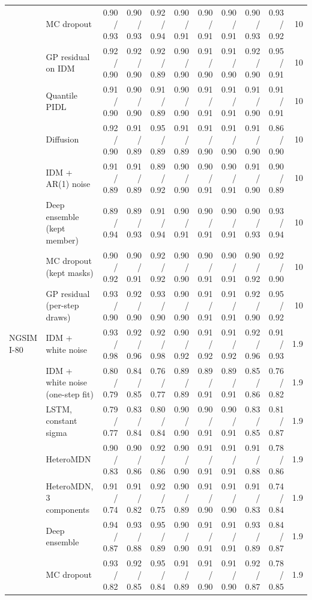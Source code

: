 \begin{longtable}{llrrrrrrrrr}
 & MC dropout & 0.90 / 0.93 & 0.90 / 0.93 & 0.92 / 0.94 & 0.90 / 0.91 & 0.90 / 0.91 & 0.90 / 0.91 & 0.90 / 0.93 & 0.93 / 0.92 & 10 \\
 & GP residual on IDM & 0.92 / 0.90 & 0.92 / 0.90 & 0.92 / 0.89 & 0.90 / 0.90 & 0.91 / 0.90 & 0.91 / 0.90 & 0.92 / 0.90 & 0.95 / 0.91 & 10 \\
 & Quantile PIDL & 0.91 / 0.90 & 0.90 / 0.90 & 0.91 / 0.89 & 0.90 / 0.90 & 0.91 / 0.91 & 0.91 / 0.91 & 0.91 / 0.90 & 0.91 / 0.91 & 10 \\
 & Diffusion & 0.92 / 0.90 & 0.91 / 0.89 & 0.95 / 0.89 & 0.91 / 0.89 & 0.91 / 0.90 & 0.91 / 0.90 & 0.91 / 0.90 & 0.86 / 0.90 & 10 \\
 & IDM + AR(1) noise & 0.91 / 0.89 & 0.91 / 0.89 & 0.89 / 0.92 & 0.90 / 0.90 & 0.90 / 0.91 & 0.90 / 0.91 & 0.91 / 0.90 & 0.90 / 0.89 & 10 \\
 & Deep ensemble (kept member) & 0.89 / 0.94 & 0.89 / 0.93 & 0.91 / 0.94 & 0.90 / 0.91 & 0.90 / 0.91 & 0.90 / 0.91 & 0.90 / 0.93 & 0.93 / 0.94 & 10 \\
 & MC dropout (kept masks) & 0.90 / 0.92 & 0.90 / 0.91 & 0.92 / 0.92 & 0.90 / 0.90 & 0.90 / 0.91 & 0.90 / 0.91 & 0.90 / 0.92 & 0.92 / 0.90 & 10 \\
 & GP residual (per-step draws) & 0.93 / 0.90 & 0.92 / 0.90 & 0.93 / 0.90 & 0.90 / 0.90 & 0.91 / 0.91 & 0.91 / 0.91 & 0.92 / 0.90 & 0.95 / 0.92 & 10 \\
\midrule
NGSIM I-80 & IDM + white noise & 0.93 / 0.98 & 0.92 / 0.96 & 0.92 / 0.98 & 0.90 / 0.92 & 0.91 / 0.92 & 0.91 / 0.92 & 0.92 / 0.96 & 0.91 / 0.93 & 1.9 \\
 & IDM + white noise (one-step fit) & 0.80 / 0.79 & 0.84 / 0.85 & 0.76 / 0.77 & 0.89 / 0.89 & 0.89 / 0.91 & 0.89 / 0.91 & 0.85 / 0.86 & 0.76 / 0.82 & 1.9 \\
 & LSTM, constant sigma & 0.79 / 0.77 & 0.83 / 0.84 & 0.80 / 0.84 & 0.90 / 0.90 & 0.90 / 0.91 & 0.90 / 0.91 & 0.83 / 0.85 & 0.81 / 0.87 & 1.9 \\
 & HeteroMDN & 0.90 / 0.83 & 0.90 / 0.86 & 0.92 / 0.86 & 0.90 / 0.90 & 0.91 / 0.91 & 0.91 / 0.91 & 0.91 / 0.88 & 0.78 / 0.86 & 1.9 \\
 & HeteroMDN, 3 components & 0.91 / 0.74 & 0.91 / 0.82 & 0.92 / 0.75 & 0.90 / 0.89 & 0.91 / 0.90 & 0.91 / 0.90 & 0.91 / 0.83 & 0.74 / 0.84 & 1.9 \\
 & Deep ensemble & 0.94 / 0.87 & 0.93 / 0.88 & 0.95 / 0.89 & 0.90 / 0.90 & 0.91 / 0.91 & 0.91 / 0.91 & 0.93 / 0.89 & 0.84 / 0.87 & 1.9 \\
 & MC dropout & 0.93 / 0.82 & 0.92 / 0.85 & 0.95 / 0.84 & 0.91 / 0.89 & 0.91 / 0.90 & 0.91 / 0.90 & 0.92 / 0.87 & 0.78 / 0.85 & 1.9 \\

\end{longtable}

